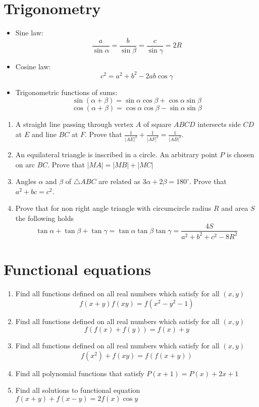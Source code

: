 \documentclass{article}
\begin{document}
	\section{Trigonometry}
		\begin{itemize}
			\item
			Sine law:
			$$\frac{a}{\sin \alpha}=\frac{b}{\sin \beta}=\frac{c}{\sin \gamma}=2R $$
			\item
			Cosine law:
			$$ c^2=a^2+b^2-2ab\cos\gamma $$
			\item
			Trigonometric functions of sums:
			$$ \sin(\alpha+\beta)=\sin\alpha\cos\beta+\cos\alpha\sin\beta $$
			$$ \cos(\alpha+\beta)=\cos\alpha\cos\beta-\sin\alpha\sin\beta $$
		\end{itemize}
		\begin{enumerate}
			\item %
			A straight line passing through vertex $A$ of square $ABCD$ intersects side $CD$ at $E$ and line $BC$ at $F$. Prove that $\frac{1}{|AE|^2}+\frac{1}{|AF|^2} =
			\frac{1}{|AB|^2}$.
			\item
			An equilateral triangle is inscribed in a circle. An arbitrary point $P$ is chosen on arc $BC$. Prove that $|MA|=|MB|+|MC|$
			\item %
			Angles $\alpha$ and $\beta$ of $\triangle ABC$ are related as $3\alpha+2\beta=180^\circ$. Prove that $a^2+bc=c^2$.
			\item %
			Prove that for non right angle triangle with circumcircle radius $R$ and area $S$ the following holds
			$$ \tan\alpha+\tan\beta+\tan\gamma=\tan\alpha\tan\beta\tan\gamma=\frac{4S}{a^2+b^2+c^2-8R^2}$$
		\end{enumerate}
	
	\newpage
	
	\section{Functional equations}
		\begin{enumerate}  
			\item %
			Find all functions defined on all real numbers which satisfy for  all $(x,y)$
			$$f(x+y)f(xy)=f(x^2-y^2-1) $$
			\item %
			Find all functions defined on all real numbers which satisfy for all $(x,y)$
			$$f(f(x)+f(y))=f(x)+y $$
			\item %
			Find all functions defined on all real numbers which satisfy for all $(x,y)$
			$$f(x^2)+f(xy)=f(f(x+y)) $$
			\item %
			Find all polynomial functions that satisfy $P(x+1)=P(x)+2x+1$
			\item%
			Find all solutions to functional equation $f(x+y) + f(x-y) = 2f(x)\cos y$
			
			
		\end{enumerate}
	
\end{document}
